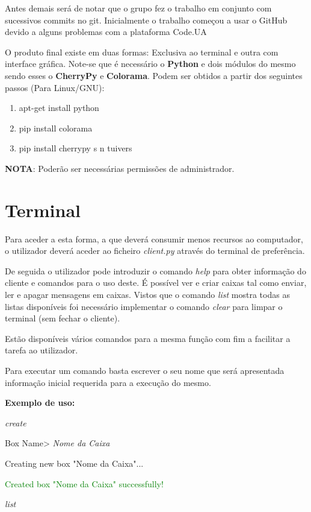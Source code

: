 \documentclass{report}
\begin{document}
Antes demais será de notar que o grupo fez o trabalho em conjunto com sucessivos commits no git. Inicialmente o trabalho começou a usar o GitHub devido a alguns problemas com a plataforma Code.UA

O produto final existe em duas formas: Exclusiva ao terminal e outra com interface gráfica. Note-se que é necessário o \textbf{Python} e dois módulos do mesmo sendo esses o \textbf{CherryPy} e \textbf{Colorama}. Podem ser obtidos a partir dos seguintes passos (Para Linux/GNU):

\begin{enumerate}
\item apt-get install python 
\item pip install colorama
\item pip install cherrypy s n tuivers
\end{enumerate}

\textbf{NOTA}: Poderão ser necessárias permissões de administrador.

\section{Terminal}

Para aceder a esta forma, a que deverá consumir menos recursos ao computador, o utilizador deverá aceder ao ficheiro \textit{client.py} através do terminal de preferência.

De seguida o utilizador pode introduzir o comando \textit{help} para obter informação do cliente e comandos para o uso deste. É possível ver e criar caixas tal como enviar, ler e apagar mensagens em caixas. Vistos que o comando \textit{list} mostra todas as listas disponíveis foi necessário implementar o comando \textit{clear} para limpar o terminal (sem fechar o cliente).

Estão disponíveis vários comandos para a mesma função com fim a facilitar a tarefa ao utilizador.

Para executar um comando basta escrever o seu nome que será apresentada informação inicial requerida para a execução do mesmo.

\textbf{Exemplo de uso:} 


	\textit{create}	
	
	Box Name> \textit{Nome da Caixa}
	
	Creating new box "Nome da Caixa"...
	
	\textcolor{green}{Created box "Nome da Caixa" successfully!}
	
	\textit{list}	
	
\end{document}
